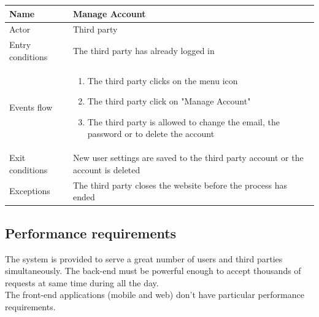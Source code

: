 \documentclass{article}
\begin{document}
\begin{table}[H]
    \begin{tabular}{|l|l|}
    \hline
    Name & \begin{minipage}[t]{0.7\textwidth}\textbf{Manage Account} \end{minipage} \\ \hline  
    Actor & \begin{minipage}[t]{0.7\textwidth}Third party\end{minipage} \\ \hline 
    Entry conditions & \begin{minipage}[t]{0.7\textwidth} The third party has already logged in \end{minipage} \\
    \hline 
    Events flow & \begin{minipage}[t]{0.7\textwidth}
    \begin{enumerate}
        \item The third party clicks on the menu icon
        \item The third party click on "Manage Account"
        \item The third party is allowed to change the email, the password or to
        delete the account
    \end{enumerate}
    \end{minipage} \\ \hline
    Exit conditions & \begin{minipage}[t]{0.7\textwidth} New user settings are
    saved to the third party account or the account is deleted\end{minipage} \\
    \hline
    Exceptions & \begin{minipage}[t]{0.7\textwidth}The third party closes the
    website before the process has ended \end{minipage} \\ \hline
    \end{tabular}
\end{table}


\subsection{Performance requirements}
The system is provided to serve a great number of users and third parties
simultaneously. The back-end must be powerful enough to accept thousands of
requests at same time during all the day.\\
The front-end applications (mobile and web) don't have particular performance
requirements.
\end{document}
